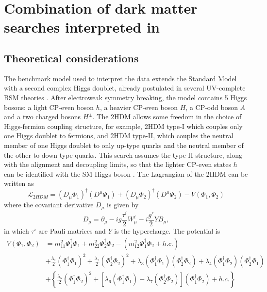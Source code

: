 \chapter{Combination of dark matter searches interpreted in \thdma}
\label{chap:combination-dark-matter-2hdma}


\section{Theoretical considerations}
\label{sect:theoretical-considerations-2hdma}
The benchmark model used to interpret the data extends the Standard Model with a second complex Higgs doublet, already postulated in several UV-complete BSM theories \cite{Buckley:2014fba,Abercrombie:2015wmb}. After electroweak symmetry breaking, the model contains 5 Higgs bosons: a light CP-even boson $h$, a heavier CP-even boson $H$, a CP-odd boson $A$ and a two charged bosons $H^{\pm}$. The 2HDM allows some freedom in the choice of Higgs-fermion coupling structure, for example, 2HDM type-I which couples only one Higgs doublet to fermions, and 2HDM type-II, which couples the neutral member of one Higgs doublet to only up-type quarks and the neutral member of the other to down-type quarks. This search assumes the type-II structure, along with the alignment and decoupling limits, so that the lighter CP-even states $h$ can be identified with the SM Higgs boson \cite{Gunion:2002zf}. The Lagrangian of the 2HDM can be written as 
\begin{equation}
    \label{4.1}
    \mathcal{L}_{2HDM} = (D_{\mu}\Phi_1)^{\dag}(D^{\mu}\Phi_1) + (D_{\mu}\Phi_2)^{\dag}(D^{\mu}\Phi_2) - V(\Phi_1, \Phi_2)
\end{equation}
where the covariant derivative $D_{\mu}$ is given by 
$$D_{\mu} = \partial_{\mu} - ig\frac{\tau^i}{2}W^i_{\mu} - i\frac{g'}{2}YB_{\mu},$$
in which $\tau^i$ are Pauli matrices and $Y$ is the hypercharge. The potential is
\begin{equation} \label{4.2}
    \begin{split} 
        V(\Phi_1, \Phi_2)  &= m_{11}^2\Phi_1^{\dag}\Phi_1 + m_{22}^2\Phi_2^{\dag}\Phi_2 - (m_{12}^2 \Phi_1^{\dag}\Phi_2 + h.c.) \\
        &+ \frac{\lambda_1}{2}(\Phi_1^{\dag}\Phi_1)^2 + \frac{\lambda_2}{2}(\Phi_2^{\dag}\Phi_2)^2  
        + \lambda_3(\Phi_1^{\dag}\Phi_1)(\Phi_2^{\dag}\Phi_2) + \lambda_4 (\Phi_1^{\dag}\Phi_2)(\Phi_2^{\dag}\Phi_1) \\ 
        &+ \left\{ \frac{\lambda_5}{2} (\Phi_1^{\dag}\Phi_2)^2 + [\lambda_6(\Phi_1^{\dag}\Phi_1) + \lambda_7(\Phi_2^{\dag}\Phi_2) ](\Phi_1^{\dag}\Phi_2) + h.c. \right\} 
    \end{split}
\end{equation}
